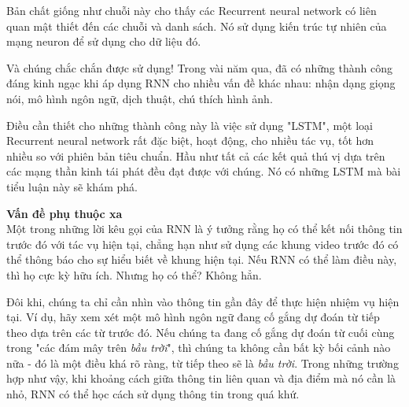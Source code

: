 Bản chất giống như chuỗi này cho thấy các Recurrent neural network có liên quan mật thiết đến các chuỗi và danh sách.
Nó sử dụng kiến trúc tự nhiên của mạng neuron để sử dụng cho dữ liệu đó.

Và chúng chắc chắn được sử dụng!
Trong vài năm qua, đã có những thành công đáng kinh ngạc khi áp dụng RNN cho nhiều vấn đề khác nhau: nhận dạng giọng
nói, mô hình ngôn ngữ, dịch thuật, chú thích hình ảnh.

Điều cần thiết cho những thành công này là việc sử dụng "LSTM", một loại Recurrent neural network rất đặc biệt, hoạt
động, cho nhiều tác vụ, tốt hơn nhiều so với phiên bản tiêu chuẩn. Hầu như tất cả các kết quả thú vị dựa trên các mạng thần kinh tái phát đều đạt được với chúng. Nó có những LSTM mà bài tiểu luận này sẽ khám phá.

\textbf{Vấn đề phụ thuộc xa} \\[0.2em]
Một trong những lời kêu gọi của RNN là ý tưởng rằng họ có thể kết nối thông tin trước đó với tác vụ hiện tại, chẳng
hạn như sử dụng các khung video trước đó có thể thông báo cho sự hiểu biết về khung hiện tại. Nếu RNN có thể làm điều
này, thì họ cực kỳ hữu ích. Nhưng họ có thể? Không hẳn.

Đôi khi, chúng ta chỉ cần nhìn vào thông tin gần đây để thực hiện nhiệm vụ hiện tại. Ví dụ, hãy xem xét một mô hình
ngôn ngữ đang cố gắng dự đoán từ tiếp theo dựa trên các từ trước đó. Nếu chúng ta đang cố gắng dự đoán từ cuối cùng
trong "các đám mây trên \textit{bầu trời}", thì chúng ta không cần bất kỳ bối cảnh nào nữa - đó là một điều khá rõ ràng,
từ tiếp theo sẽ là  \textit{bầu trời}. Trong những trường hợp như vậy, khi khoảng cách giữa thông tin liên quan và
địa điểm mà nó cần là nhỏ, RNN có thể học cách sử dụng thông tin trong quá khứ.

\begin{figure}[!htb]
\end{figure}

